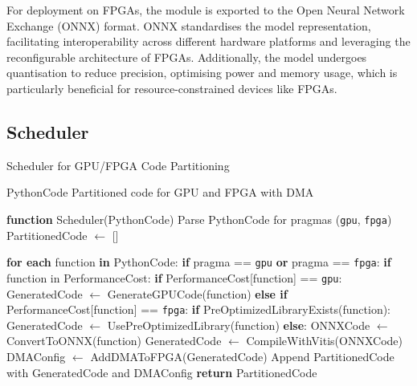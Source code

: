 \documentclass[]{spie}  %
\begin{document}
For deployment on FPGAs, the module is exported to the Open Neural Network Exchange (ONNX) format. ONNX standardises the model representation, facilitating interoperability across different hardware platforms and leveraging the reconfigurable architecture of FPGAs. Additionally, the model undergoes quantisation to reduce precision, optimising power and memory usage, which is particularly beneficial for resource-constrained devices like FPGAs.

\subsection{Scheduler}

\begin{algorithm}
\caption{Scheduler for GPU/FPGA Code Partitioning}
\begin{algorithmic}[1]
\REQUIRE PythonCode
\ENSURE Partitioned code for GPU and FPGA with DMA

\STATE \textbf{function} Scheduler(PythonCode)
\STATE \hspace{1em} Parse PythonCode for pragmas (\texttt{gpu}, \texttt{fpga})
\STATE \hspace{1em} PartitionedCode $\leftarrow$ []

\STATE \hspace{1em} \textbf{for each} function \textbf{in} PythonCode:
\STATE \hspace{2em} \textbf{if} pragma == \texttt{gpu} \textbf{or} pragma == \texttt{fpga}:
\STATE \hspace{3em} \textbf{if} function in PerformanceCost:
\STATE \hspace{4em} \textbf{if} PerformanceCost[function] == \texttt{gpu}:
\STATE \hspace{5em} GeneratedCode $\leftarrow$ GenerateGPUCode(function)
\STATE \hspace{4em} \textbf{else if} PerformanceCost[function] == \texttt{fpga}:
\STATE \hspace{5em} \textbf{if} PreOptimizedLibraryExists(function):
\STATE \hspace{6em} GeneratedCode $\leftarrow$ UsePreOptimizedLibrary(function)
\STATE \hspace{5em} \textbf{else}:
\STATE \hspace{6em} ONNXCode $\leftarrow$ ConvertToONNX(function)
\STATE \hspace{6em} GeneratedCode $\leftarrow$ CompileWithVitis(ONNXCode)
\STATE \hspace{5em} DMAConfig $\leftarrow$ AddDMAToFPGA(GeneratedCode)
\STATE \hspace{4em} Append PartitionedCode with GeneratedCode and DMAConfig
\STATE \hspace{1em} \textbf{return} PartitionedCode


\end{algorithmic}
\end{algorithm}
\end{document}
